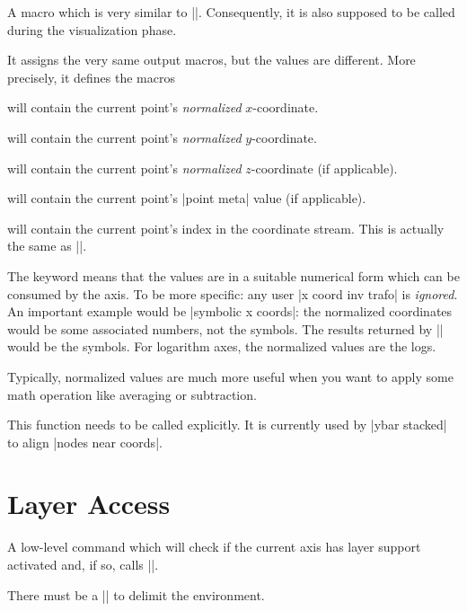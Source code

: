 \begin{command}{\pgfplotspointgetnormalizedcoordinates}
    A macro which is very similar to |\pgfplotspointgetcoordinates|.
    Consequently, it is also supposed to be called during the visualization phase.

    It assigns the very same output macros, but the values are different. More
    precisely, it defines the macros

     will contain the current point's
    \emph{normalized} $x$-coordinate.

     will contain the current point's
    \emph{normalized} $y$-coordinate.

     will contain the current point's
    \emph{normalized} $z$-coordinate (if applicable).

     will contain the current point's
    |point meta| value (if applicable).

     will contain the current point's index in
    the coordinate stream. This is actually the same as |\coordindex|.

    The keyword  means that the values are in a
    suitable numerical form which can be consumed by the axis. To be more
    specific: any user |x coord inv trafo| is \emph{ignored}. An important
    example would be |symbolic x coords|: the normalized coordinates would be
    some associated numbers, not the symbols. The results returned by
    |\pgfplotspointgetcoordinates| would be the symbols. For logarithm axes,
    the normalized values are the logs.

    Typically, normalized values are much more useful when you want to apply
    some math operation like averaging or subtraction.

    This function needs to be called explicitly. It is currently used by
    |ybar stacked| to align |nodes near coords|.
\end{command}


\section[layer-access]{Layer Access}

\begin{command}{\pgfplotsonlayer{}}
    A low-level command which will check if the current axis has layer support
    activated and, if so, calls |\pgfonlayer|.

    There must be a |\endpgfplotsonlayer| to delimit the environment.
\end{command}

